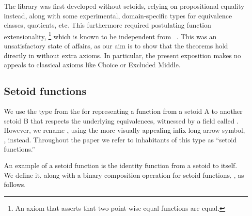 \ddmmyydate



The \agdaalgebras library was first developed without setoids, relying on
propositional equality  instead,
along with some experimental, domain-specific types for equivalence classes, quotients, etc.
This furthermore required postulating function extensionality,%
\footnote{An axiom that asserts that two point-wise equal functions are equal.} which is
known to be independent from \mltt~\cite{MHE, MHE:2019}. This was
an unsatisfactory state of affairs, as %
our aim is to show that the theorems hold directly in \mltt without extra axioms.
In particular, the present exposition makes no appeals to classical axioms like Choice or Excluded Middle.


\subsection{Setoid functions}
\label{setoid-functions}
We use the  type from the \agdastdlib for representing a function from
a setoid \ab A to another setoid \ab B that respects the underlying equivalences,
witnessed by a field called .  However, we rename , using
the more visually appealing infix long arrow symbol,
, instead. Throughout the
paper we refer to inhabitants of this type as ``setoid functions.''

\ifshort\else
An example of a setoid function is the identity function from a setoid to itself.
We define it, along with a binary composition operation for setoid functions,
, as follows.

